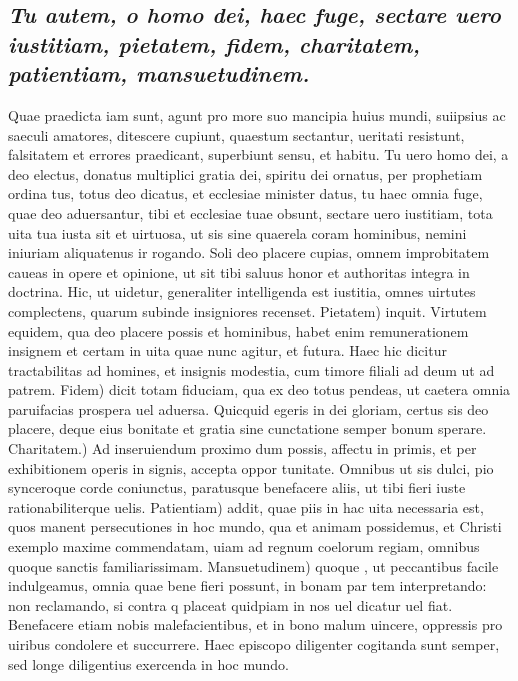 \documentclass{article}
\begin{document}
\begin{pages}
\subsection*{\textit{Tu autem, o homo dei, haec fuge, sectare uero iustitiam, pietatem, fidem, charitatem, patientiam, mansuetudinem. }}\pstart Quae praedicta iam sunt, agunt pro more suo mancipia huius mundi, suiipsius ac saeculi amatores, ditescere cupiunt, quaestum sectantur, ueritati resistunt, falsitatem et errores praedicant, superbiunt sensu, et habitu. Tu uero homo dei, a deo electus, donatus multiplici gratia dei, spiritu dei ornatus, per prophetiam ordina tus, totus deo dicatus, et ecclesiae minister datus, tu haec omnia fuge, quae deo aduersantur, tibi et ecclesiae tuae obsunt, sectare uero iustitiam, tota uita tua iusta sit et uirtuosa, ut sis sine quaerela coram hominibus, nemini iniuriam aliquatenus ir rogando. Soli deo placere cupias, omnem improbitatem caueas in opere et opinione, ut sit tibi saluus honor et authoritas integra in doctrina. Hic, ut uidetur, generaliter intelligenda est iustitia, omnes uirtutes complectens, quarum subinde insigniores recenset. Pietatem) inquit. Virtutem equidem, qua deo placere possis et hominibus, habet enim remunerationem insignem et certam in uita quae nunc agitur, et futura. Haec hic dicitur tractabilitas ad homines, et insignis modestia, cum timore filiali ad deum ut ad patrem. Fidem) dicit totam fiduciam, qua ex deo totus pendeas, ut caetera omnia paruifacias prospera uel aduersa. Quicquid egeris in dei gloriam, certus sis deo placere, deque eius bonitate et gratia sine cunctatione semper bonum sperare. Charitatem.) Ad inseruiendum proximo dum possis, affectu in primis, et per exhibitionem operis in signis, accepta oppor tunitate. Omnibus ut sis dulci, pio synceroque corde coniunctus, paratusque benefacere aliis, ut tibi fieri iuste rationabiliterque uelis. Patientiam) addit, quae piis in hac uita necessaria est, quos manent persecutiones in hoc mundo, qua et animam possidemus, et Christi exemplo maxime commendatam, uiam ad regnum coelorum regiam, omnibus quoque sanctis familiarissimam. Mansuetudinem) quoque , ut peccantibus facile indulgeamus, omnia quae bene fieri possunt, in bonam par tem interpretando: non reclamando, si contra q placeat quidpiam in nos uel dicatur uel fiat. Benefacere etiam nobis malefacientibus, et in bono malum uincere, oppressis pro uiribus condolere et succurrere. Haec episcopo diligenter cogitanda sunt semper, sed longe diligentius exercenda in hoc mundo.  \pend
{}
{}

\end{pages}
\end{document}
